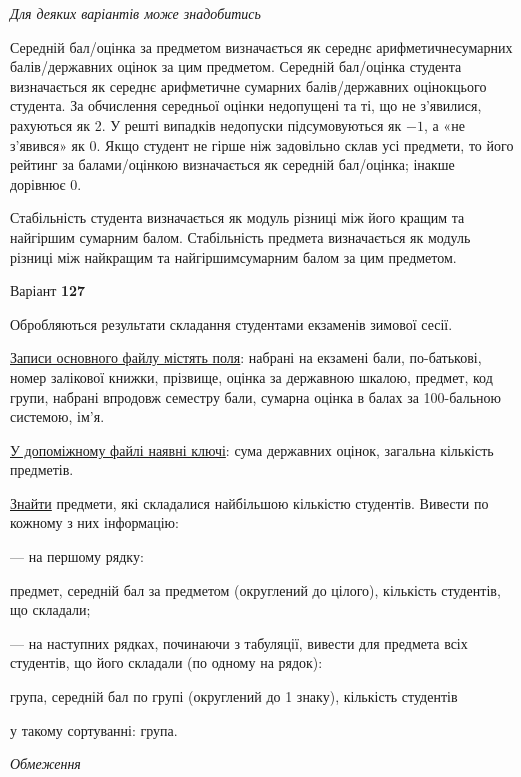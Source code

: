 \documentclass[11pt, ukrainian]{article}
\begin{document}
\bigskip\textit{Для деяких варіантів може знадобитись}

Середній бал/оцінка за предметом визначається як середнє арифметичнесумарних балів/державних оцінок за цим предметом. 
Середній бал/оцінка студента визначається як середнє арифметичне сумарних балів/державних оцінокцього студента. 
За обчислення середньої оцінки недопущені та ті, що не з’явилися, рахуються як 2.
У решті випадків недопуски підсумовуються як $-1$, а «не з’явився» як 0.
Якщо студент не гірше ніж задовільно склав усі предмети, 
то його рейтинг за балами/оцінкою визначається як середній бал/оцінка; інакше дорівнює 0.

Стабільність студента визначається як модуль різниці між його кращим та найгіршим сумарним балом.
Стабільність предмета визначається як модуль різниці між найкращим та найгіршимсумарним балом за цим предметом.






\par
\newpage
{\center Варіант  \No \textbf { 127 }\par}
\bigskip
Обробляються результати складання студентами екзаменів зимової сесії.

\underline{Записи основного файлу містять поля}: набрані на екзамені бали, по-батькові, номер залікової книжки, прізвище, оцінка за державною шкалою, предмет, код групи, набрані впродовж семестру бали, сумарна оцінка в балах за 100-бальною системою, ім’я.

\underline{У допоміжному файлі наявні ключі}: сума державних оцінок, загальна кількість предметів.

\underline{Знайти} предмети, які складалися найбільшою кількістю студентів. Вивести по кожному з них інформацію:\par
{\noindent}--- на першому рядку:\par
предмет, середній бал за предметом (округлений до цілого), кількість студентів, що складали;

{\noindent}--- на наступних рядках, починаючи з табуляції, вивести для предмета всіх студентів, що його складали (по одному на рядок):\par
група, середній бал по групі (округлений до 1 знаку), кількість студентів

{\noindent}у такому сортуванні: група.


\bigskip\textit{Обмеження}
\end{document}
